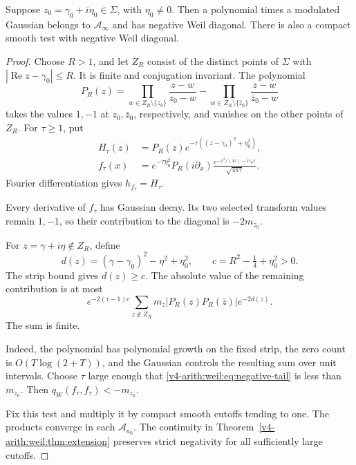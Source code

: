 \begin{theorem}
\label{v4-arith:weil:thm:negative-test}
Suppose \(z_0=\gamma_0+i\eta_0\in\Sigma\), with \(\eta_0\ne0\).
Then a polynomial times a modulated Gaussian belongs to
\(\mathscr A_\infty\) and has negative Weil diagonal.
There is also a compact smooth test with negative Weil diagonal.
\end{theorem}
\begin{proof}
Choose \(R>1\), and let \(Z_R\) consist of the distinct points of
\(\Sigma\) with \(|\operatorname{Re}z-\gamma_0|\le R\).
It is finite and conjugation invariant. The polynomial
\[
 P_R(z)=\prod_{w\in Z_R\setminus\{z_0\}}
                  \frac{z-w}{z_0-w}
       -\prod_{w\in Z_R\setminus\{\bar z_0\}}
                  \frac{z-w}{\bar z_0-w}
\]
takes the values \(1,-1\) at \(z_0,\bar z_0\), respectively, and
vanishes on the other points of \(Z_R\). For \(\tau\ge1\), put
\begin{equation}
 \begin{aligned}
 H_\tau(z)&=P_R(z)
            e^{-\tau((z-\gamma_0)^2+\eta_0^2)},\\
 f_\tau(x)&=e^{-\tau\eta_0^2}P_R(i\partial_x)
         \frac{e^{-x^2/(4\tau)-i\gamma_0x}}{\sqrt{4\pi\tau}}.
 \end{aligned}
 \label{v4-arith:weil:eq:negative-test}
\end{equation}
Fourier differentiation gives \(h_{f_\tau}=H_\tau\).

Every derivative of \(f_\tau\) has Gaussian decay.
Its two selected transform values remain \(1,-1\), so their
contribution to the diagonal is \(-2m_{z_0}\).

For \(z=\gamma+i\eta\notin Z_R\), define
\[
 d(z)=(\gamma-\gamma_0)^2-\eta^2+\eta_0^2,
 \qquad c=R^2-\tfrac14+\eta_0^2>0.
\]
The strip bound gives \(d(z)\ge c\). The absolute value of the
remaining contribution is at most
\begin{equation}
 e^{-2(\tau-1)c}
   \sum_{z\notin Z_R}m_z|P_R(z)P_R(\bar z)|e^{-2d(z)}.
 \label{v4-arith:weil:eq:negative-tail}
\end{equation}
The sum is finite.

Indeed, the polynomial has polynomial growth
on the fixed strip, the zero count is \(O(T\log(2+T))\), and the
Gaussian controls the resulting sum over unit intervals.
Choose \(\tau\) large enough that \eqref{v4-arith:weil:eq:negative-tail}
is less than \(m_{z_0}\). Then \(q_W(f_\tau,f_\tau)<-m_{z_0}\).

Fix this test and multiply it by compact smooth cutoffs tending to one.
The products converge in each \(\mathscr A_{a_0}\).
The continuity in Theorem~\ref{v4-arith:weil:thm:extension} preserves
strict negativity for all sufficiently large cutoffs.
\end{proof}


